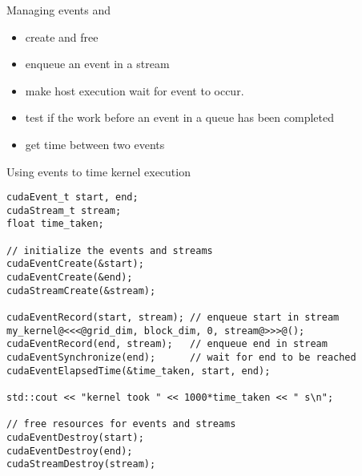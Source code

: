 \begin{frame}[fragile]{}
    \begin{info}{Managing events}
         and 
            \begin{itemize}
                \item create and free 
            \end{itemize}
            \begin{itemize}
                \item enqueue an event in a stream
            \end{itemize}
            \begin{itemize}
                \item make host execution wait for event to occur.
            \end{itemize}
            \begin{itemize}
                \item test if the work before an event in a queue has been completed
            \end{itemize}
            \begin{itemize}
                \item get time between two events
            \end{itemize}
    \end{info}
\end{frame}

\begin{frame}[fragile]{}
    \begin{code}{Using events to time kernel execution}
        \begin{lstlisting}[style=boxcudatiny]
cudaEvent_t start, end;
cudaStream_t stream;
float time_taken;

// initialize the events and streams
cudaEventCreate(&start);
cudaEventCreate(&end);
cudaStreamCreate(&stream);

cudaEventRecord(start, stream); // enqueue start in stream
my_kernel@<<<@grid_dim, block_dim, 0, stream@>>>@();
cudaEventRecord(end, stream);   // enqueue end in stream
cudaEventSynchronize(end);      // wait for end to be reached
cudaEventElapsedTime(&time_taken, start, end);

std::cout << "kernel took " << 1000*time_taken << " s\n";

// free resources for events and streams
cudaEventDestroy(start);
cudaEventDestroy(end);
cudaStreamDestroy(stream);
        \end{lstlisting}
    \end{code}
\end{frame}

